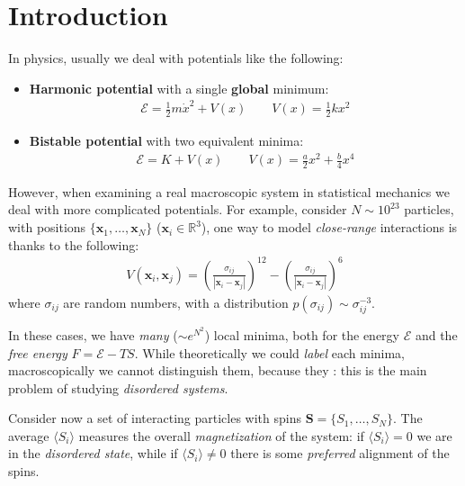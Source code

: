 \documentclass[../template.tex]{subfiles}
\begin{document}
\section{Introduction}
In physics, usually we deal with potentials like the following:
\begin{itemize}
    \item \textbf{Harmonic potential} with a single \textbf{global} minimum: 
    \begin{align*}
        \mathcal{E} = \frac{1}{2} m \dot{x}^2 + V(x) \qquad V(x) = \frac{1}{2} k x^2  
    \end{align*} 
    \item \textbf{Bistable potential} with two equivalent minima:
    \begin{align*}
        \mathcal{E} = K + V(x) \qquad V(x) = \frac{a}{2}x^2  + \frac{b}{4}x^4   
    \end{align*} 
\end{itemize}
However, when examining a real macroscopic system in statistical mechanics we deal with more complicated potentials. For example, consider $N \sim 10^{23}$ particles, with positions $\{\bm{x}_1, \dots, \bm{x}_N\}$ ($\bm{x}_i \in \mathbb{R}^3$), one way to model \textit{close-range} interactions is thanks to the following:
\begin{align*}
    V(\bm{x}_i, \bm{x}_j) = \left(\frac{\sigma_{ij}}{|\bm{x}_i - \bm{x}_j|} \right)^{12} - \left(\frac{\sigma_{ij}}{|\bm{x}_i - \bm{x}_j|} \right)^6
\end{align*}   
where $\sigma_{ij}$ are random numbers, with a distribution $p(\sigma_
{ij}) \sim \sigma_{ij}^{-3}$. 

In these cases, we have \textit{many} ($\sim e^{N^2}$) local minima, both for the energy $\mathcal{E}$ and the \textit{free energy} $F = \mathcal{E} - TS$. While theoretically we could \textit{label} each minima, macroscopically we cannot distinguish them, because they : this is the main problem of studying \textit{disordered systems}.


Consider now a set of interacting particles with spins $\bm{S} = \{S_1, \dots, S_N\}$. The average $\langle S_i \rangle$ measures the overall \textit{magnetization} of the system: if $\langle S_i \rangle = 0$ we are in the \textit{disordered state}, while if $\langle S_i \rangle \neq 0$ there is some \textit{preferred} alignment of the spins.
\end{document}
